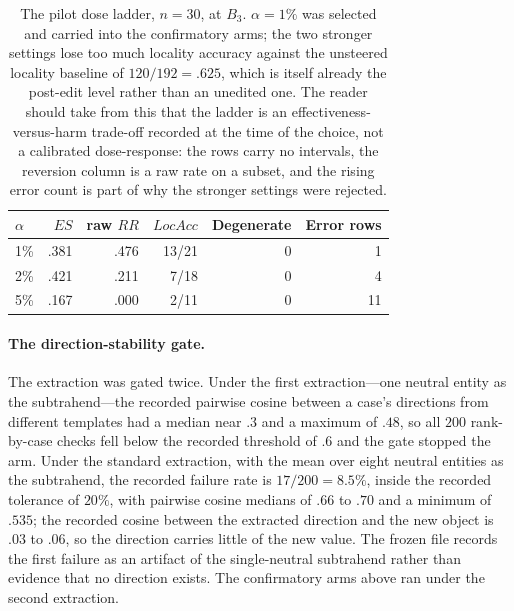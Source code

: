 \documentclass[letterpaper]{article}
\begin{document}
\begin{table}[t]
\centering
\small
\begin{tabular}{@{}lrrrrr@{}}
\toprule
\(\alpha\) & \(ES\) & raw \(RR\) & \(LocAcc\) & Degenerate & Error rows \\
\midrule
1\% & .381 & .476 & 13/21 & 0 & 1 \\
2\% & .421 & .211 & 7/18  & 0 & 4 \\
5\% & .167 & .000 & 2/11  & 0 & 11 \\
\bottomrule
\end{tabular}
\caption{The pilot dose ladder, \(n=30\), at \(B_3\).  \(\alpha=1\%\) was
selected and carried into the confirmatory arms; the two stronger settings lose
too much locality accuracy against the unsteered locality baseline of
\(120/192=.625\), which is itself already the post-edit level rather than an
unedited one.  The reader should take from this that the ladder is an
effectiveness-versus-harm trade-off recorded at the time of the choice, not a
calibrated dose-response: the rows carry no intervals, the reversion column is a
raw rate on a subset, and the rising error count is part of why the stronger
settings were rejected.}
\label{tab:s9-pilot}
\end{table}

\paragraph{The direction-stability gate.}
The extraction was gated twice.  Under the first extraction---one neutral entity
as the subtrahend---the recorded pairwise cosine between a case's directions from
different templates had a median near \(.3\) and a maximum of \(.48\), so all
\(200\) rank-by-case checks fell below the recorded threshold of \(.6\) and the
gate stopped the arm.  Under the standard extraction, with the mean over eight
neutral entities as the subtrahend, the recorded failure rate is \(17/200=8.5\%\),
inside the recorded tolerance of \(20\%\), with pairwise cosine medians of
\(.66\) to \(.70\) and a minimum of \(.535\); the recorded cosine between the
extracted direction and the new object is \(.03\) to \(.06\), so the direction
carries little of the new value.  The frozen file records the first failure as an
artifact of the single-neutral subtrahend rather than evidence that no direction
exists.  The confirmatory arms above ran under the second extraction.
\end{document}
